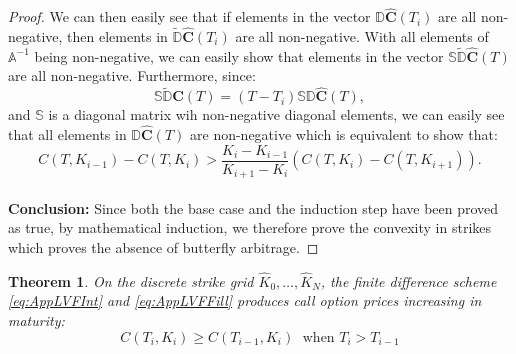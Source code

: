 \documentclass[letterpaper,12pt,titlepage,oneside,final]{book}
\numberwithin{equation}{section}
\newtheorem{thm}{Theorem}[section]
\theoremstyle{definition}
\begin{document}
\begin{proof}
		We can then easily see that 
		if elements in the vector $\mathcal{\mathbb{D}}\widehat{\mathbf{C}}(T_i)$ are all non-negative, then elements in  $\widetilde{\mathcal{\mathbb{D}}}\widehat{\mathbf{C}}(T_i)$ are all non-negative.
		With all elements of $\mathcal{\mathbb{A}}^{-1}$ being non-negative, we can easily show that elements in the vector $\mathcal{\mathbb{S}}\widetilde{\mathcal{\mathbb{D}}}\widehat{\mathbf{C}}(T)$ are all non-negative. Furthermore, since:
		\[
			\mathcal{\mathbb{S}}\widetilde{\mathcal{\mathbb{D}}}\widehat{\mathbf{C}}(T)	=	(T-T_i)\mathcal{\mathbb{S}}\mathcal{\mathbb{D}} \widehat{\mathbf{C}}(T),
		\] and $\mathcal{\mathbb{S}}$ is a diagonal matrix wih non-negative diagonal elements, we can easily see that  all elements in $\mathcal{\mathbb{D}}\widehat{\mathbf{C}}(T)$ are non-negative which is equivalent to show that:
		\[
				C(T,K_{i-1})-C(T,K_{i}) > \frac{K_i-K_{i-1}}{K_{i+1}-K_{i}}\left( C(T,K_{i})-C(T,K_{i+1})  \right).
		\]
	   \\\textbf{Conclusion:}  Since both the base case and the induction step have been proved as true, by mathematical induction, we therefore prove the convexity in strikes which proves the absence of butterfly arbitrage.



\end{proof}
\begin{thm}
	\label{thm:LVFProof1}
	On the discrete strike grid $\widehat{K}_0,\dots, \widehat{K}_{N}$, the finite difference scheme \eqref{eq:AppLVFInt} and  \eqref{eq:AppLVFFill} produces call option prices increasing in maturity:
	\[
			C(T_i,K_{i})\geq C(T_{i-1},K_{i}) \; \text{ when } T_{i}>T_{i-1}
	\]

 
\end{thm}
\end{document}
